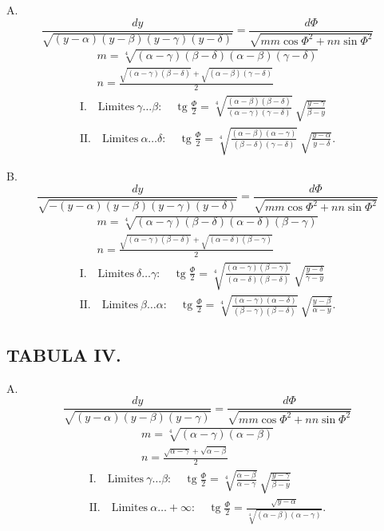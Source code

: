 \documentclass{article}
\begin{document}
A.
\[
\frac{dy}{\sqrt{(y-\alpha)(y-\beta)(y-\gamma)(y-\delta)}}=\frac{d\Phi}{\sqrt{mm\cos\Phi^{2}+nn\sin\Phi^{2}}}
\]
\[
\begin{gathered}
m=\sqrt[4]{(\alpha-\gamma)(\beta-\delta)(\alpha-\beta)(\gamma-\delta)}\\
n=\frac{\sqrt{(\alpha-\gamma)(\beta-\delta)}+\sqrt{(\alpha-\beta)(\gamma-\delta)}}{2}
\end{gathered}
\]
\[
\begin{gathered}
\text{I.}\quad\text{Limites}\ \gamma\ldots\beta:\quad\operatorname{tg}\frac{\Phi}{2}=\sqrt[4]{\frac{(\alpha-\beta)(\beta-\delta)}{(\alpha-\gamma)(\gamma-\delta)}}\ \sqrt{\frac{y-\gamma}{\beta-y}}\\
\text{II.}\quad\text{Limites}\ \alpha\ldots\delta:\quad\operatorname{tg}\frac{\Phi}{2}=\sqrt[4]{\frac{(\alpha-\beta)(\alpha-\gamma)}{(\beta-\delta)(\gamma-\delta)}}\ \sqrt{\frac{y-\alpha}{y-\delta}}.
\end{gathered}
\]

B.
\[
\frac{dy}{\sqrt{-(y-\alpha)(y-\beta)(y-\gamma)(y-\delta)}}=\frac{d\Phi}{\sqrt{mm\cos\Phi^{2}+nn\sin\Phi^{2}}}
\]
\[
\begin{gathered}
m=\sqrt[4]{(\alpha-\gamma)(\beta-\delta)(\alpha-\delta)(\beta-\gamma)}\\
n=\frac{\sqrt{(\alpha-\gamma)(\beta-\delta)}+\sqrt{(\alpha-\delta)(\beta-\gamma)}}{2}
\end{gathered}
\]
\[
\begin{gathered}
\text{I.}\quad\text{Limites}\ \delta\ldots\gamma:\quad\operatorname{tg}\frac{\Phi}{2}=\sqrt[4]{\frac{(\alpha-\gamma)(\beta-\gamma)}{(\alpha-\delta)(\beta-\delta)}}\ \sqrt{\frac{y-\delta}{\gamma-y}}\\
\text{II.}\quad\text{Limites}\ \beta\ldots\alpha:\quad\operatorname{tg}\frac{\Phi}{2}=\sqrt[4]{\frac{(\alpha-\gamma)(\alpha-\delta)}{(\beta-\gamma)(\beta-\delta)}}\ \sqrt{\frac{y-\beta}{\alpha-y}}.
\end{gathered}
\]


\subsection*{TABULA IV.}

A.
\[
\frac{dy}{\sqrt{(y-\alpha)(y-\beta)(y-\gamma)}}=\frac{d\Phi}{\sqrt{mm\cos\Phi^{2}+nn\sin\Phi^{2}}}
\]
\[
\begin{gathered}
m=\sqrt[4]{(\alpha-\gamma)(\alpha-\beta)}\\
n=\frac{\sqrt{\alpha-\gamma}+\sqrt{\alpha-\beta}}{2}
\end{gathered}
\]
\[
\begin{gathered}
\text{I.}\quad\text{Limites}\ \gamma\ldots\beta:\quad\operatorname{tg}\frac{\Phi}{2}=\sqrt[4]{\frac{\alpha-\beta}{\alpha-\gamma}}\ \sqrt{\frac{y-\gamma}{\beta-y}}\\
\text{II.}\quad\text{Limites}\ \alpha\ldots+\infty:\quad\operatorname{tg}\frac{\Phi}{2}=\frac{\sqrt{y-\alpha}}{\sqrt[4]{(\alpha-\beta)(\alpha-\gamma)}}.
\end{gathered}
\]
\end{document}
